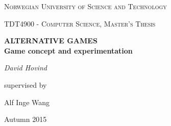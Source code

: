 \begin{titlepage}
	\centering
	{\scshape\LARGE Norwegian University of Science and Technology \par}
	\vspace{1cm}
	{\scshape\Large TDT4900 - Computer Science, Master's Thesis\par}
	\vspace{1.5cm}
	{\huge\bfseries \uppercase{Alternative Games}\\ Game concept and experimentation\par}
	\vspace{2cm}
	{\Large\itshape David Hovind\par}
	\vfill
	supervised by\par
	Alf Inge Wang
	
	\vfill
	
	{\large Autumn 2015}
\end{titlepage}
